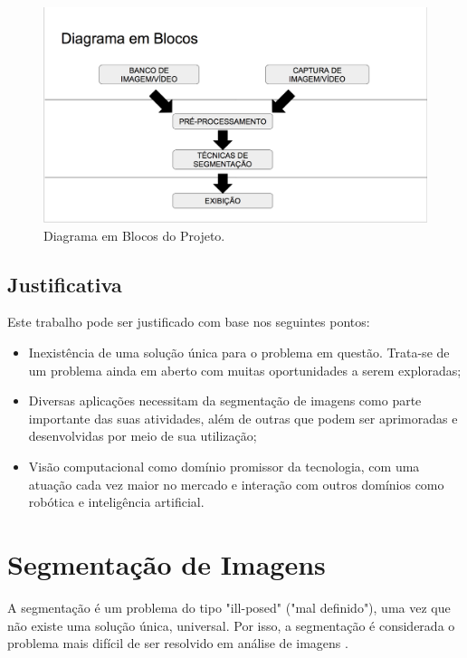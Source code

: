   \begin{figure}[!htb]
       \begin{center}  
          \includegraphics[width=0.7\columnwidth]{img/diag_blocos.png}
           \caption{\label{fig:diag_blocos}Diagrama em Blocos do Projeto.}
       \end{center}
   \end{figure}


\section{Justificativa}
Este trabalho pode ser justificado com base nos seguintes pontos:
\begin{itemize}
\item Inexistência de uma solução única para o problema em questão. Trata-se de um problema ainda em aberto com muitas oportunidades a serem exploradas;
\item Diversas aplicações necessitam da segmentação de imagens como parte importante das suas atividades, além de outras que podem ser aprimoradas e desenvolvidas por meio de sua utilização;
\item Visão computacional como domínio promissor da tecnologia, com uma atuação cada vez maior no mercado e interação com outros domínios como robótica e inteligência artificial.
\end{itemize}

\chapter{Segmentação de Imagens}\label{cap:segmentacao}
A segmentação é um problema do tipo "ill-posed" ("mal definido"), uma vez que não existe uma solução única, universal. Por isso, a segmentação é considerada o problema mais difícil de ser resolvido em análise de imagens \citep{Poggio1985}.


